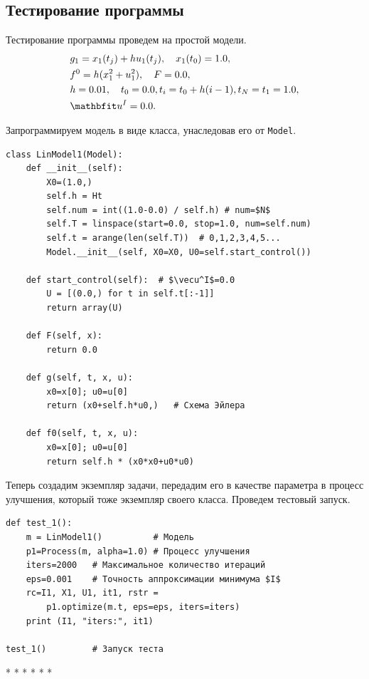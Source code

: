 \documentclass[a4paper,14pt, openany, twoside, draft]{extbook} %
\begin{document}
\subsection{Тестирование программы}
\label{sec:testing}

Тестирование программы проведем на простой модели.
\begin{align*}
  &g_1=x_1(t_j)+hu_1(t_j),\quad x_1(t_0)=1.0,\\
  &f^0=h(x_1^2+u_1^2),\quad F=0.0, \\
  &h=0.01,\quad t_0=0.0, t_i=t_0+h(i-1), t_N=t_1=1.0,\\
  &\vecu^I=0.0.
\end{align*}

Запрограммируем модель в виде класса, унаследовав его от \texttt{Model}.
\begin{verbatim}
class LinModel1(Model):
    def __init__(self):
        X0=(1.0,)
        self.h = Ht
        self.num = int((1.0-0.0) / self.h) # num=$N$
        self.T = linspace(start=0.0, stop=1.0, num=self.num)
        self.t = arange(len(self.T))  # 0,1,2,3,4,5...
        Model.__init__(self, X0=X0, U0=self.start_control())

    def start_control(self):  # $\vecu^I$=0.0
        U = [(0.0,) for t in self.t[:-1]]
        return array(U)

    def F(self, x):
        return 0.0

    def g(self, t, x, u):
        x0=x[0]; u0=u[0]
        return (x0+self.h*u0,)   # Схема Эйлера

    def f0(self, t, x, u):
        x0=x[0]; u0=u[0]
        return self.h * (x0*x0+u0*u0)
\end{verbatim}

Теперь создадим экземпляр задачи, передадим его в качестве параметра в процесс улучшения, который тоже экземпляр своего класса.  Проведем тестовый запуск.

\begin{verbatim}
def test_1():
    m = LinModel1()          # Модель
    p1=Process(m, alpha=1.0) # Процесс улучшения
    iters=2000   # Максимальное количество итераций
    eps=0.001    # Точность аппроксимации минимума $I$
    rc=I1, X1, U1, it1, rstr =
        p1.optimize(m.t, eps=eps, iters=iters)
    print (I1, "iters:", it1)

test_1()         # Запуск теста
\end{verbatim}



* * * * * *
\end{document}
